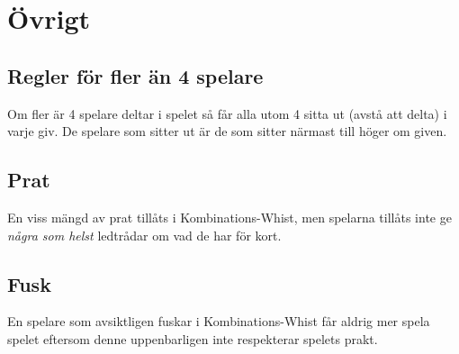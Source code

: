 \documentclass[a4paper]{article}
\begin{document}
	\section{Övrigt}
		\subsection{Regler för fler än 4 spelare}
			Om fler är 4 spelare deltar i spelet så får alla utom 4 sitta ut (avstå att delta) i varje giv. De spelare som sitter ut är de som sitter närmast till höger om given.
		
		\subsection{Prat}
			En viss mängd av prat tillåts i Kombinations-Whist, men spelarna tillåts inte ge \emph{några som helst} ledtrådar om vad de har för kort.
		
		\subsection{Fusk}
			En spelare som avsiktligen fuskar i Kombinations-Whist får aldrig mer spela spelet eftersom denne uppenbarligen inte respekterar spelets prakt.

	\pagebreak
	
	
\end{document}
